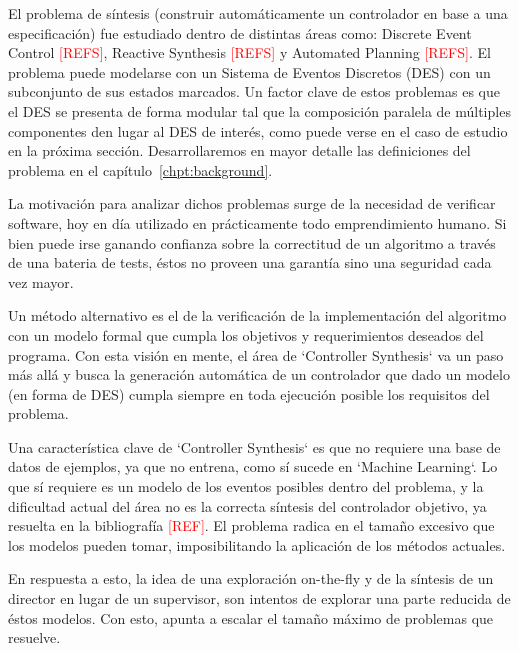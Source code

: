El problema de síntesis (construir automáticamente un controlador en base a una especificación) fue estudiado dentro de distintas áreas como: Discrete Event Control \textcolor{red}{[REFS]}, Reactive Synthesis \textcolor{red}{[REFS]} y Automated Planning \textcolor{red}{[REFS]}. El problema puede modelarse con un Sistema de Eventos Discretos (DES) con un subconjunto de sus estados marcados. Un factor clave de estos problemas es que el DES se presenta de forma modular tal que la composición paralela de múltiples componentes den lugar al DES de interés, como puede verse en el caso de estudio en la próxima sección. Desarrollaremos en mayor detalle las definiciones del problema en el capítulo~\ref{chpt:background}.

La motivación para analizar dichos problemas surge de la necesidad de verificar software, hoy en día utilizado en prácticamente todo emprendimiento humano. Si bien puede irse ganando confianza sobre la correctitud de un algoritmo a través de una bateria de tests, éstos no proveen una garantía sino una seguridad cada vez mayor. 

Un método alternativo es el de la verificación de la implementación del algoritmo con un modelo formal que cumpla los objetivos y requerimientos deseados del programa. Con esta visión en mente, el área de `Controller Synthesis` va un paso más allá y busca la generación automática de un controlador que dado un modelo (en forma de DES) cumpla siempre en toda ejecución posible los requisitos del problema.

Una característica clave de `Controller Synthesis` es que no requiere una base de datos de ejemplos, ya que no entrena, como sí sucede en `Machine Learning`. Lo que sí requiere es un modelo de los eventos posibles dentro del problema, y la dificultad actual del área no es la correcta síntesis del controlador objetivo, ya resuelta en la bibliografía \textcolor{red}{[REF]}. El problema radica en el tamaño excesivo que los modelos pueden tomar, imposibilitando la aplicación de los métodos actuales.

En respuesta a esto, la idea de una exploración on-the-fly y de la síntesis de un director en lugar de un supervisor, son intentos de explorar una parte reducida de éstos modelos. Con esto, apunta a escalar el tamaño máximo de problemas que resuelve. 



